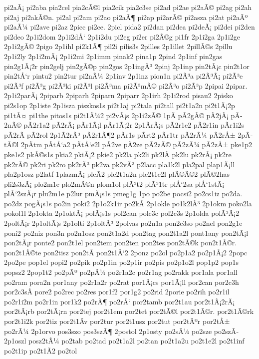 {pi2aÃ¡
pi2aba
pia2cel
pia2cÃ©l
pia2cik
pia2c3se
pi2ad
pi2ae
pi2aÃ©
pi2ag
pi2ah
pi2aj
pi2akÃ©n.
pi2al
pi2am
pi2ao
pi2aÃ¶
pi2ap
pi2arÃ©
pi2asza
pi2at
pi2aÃº
pi2aÃ¼
pi2ave
pi2az
2picc
pi2ce.
2picl
pida2
pi2dan
pi2dea
pi2deÃ¡
pi2dei
pi2den
pi2deo
2p1i2dom
2p1i2dÅ‘
2p1i2du
pi2eg
pi2er
pi2Ã©g
pi1fr
2p1i2ga
2p1i2ge
2p1i2gÃ©
2pigo
2p1ihl
pi2k1Ã¶
pil2i
pilis3s
2pilles
2p1illet
2pillÃ©s
2pillu
2p1i2ly
2p1i2mÃ¡
2p1i2mi
2p1imm
pinak2
pina1p
2pind
2p1inf
pin2gas
pin2g1Ã¡2r
pin2gelj
pin2gÃ©p
pin2gos
2p1ingÃ³
2pinj
2p1inp
pin2tÃ¡c
pin2t1or
pin2tÅ‘r
pintu2
pin2tur
pi2nÃ¼
2p1inv
2p1inz
pion1n
pi2Ã³a
pi2Ã³Ã¡
pi2Ã³e
pi2Ã³f
pi2Ã³g
pi2Ã³ki
pi2Ã³l
pi2Ã³ma
pi2Ã³mÃ©
pi2Ã³o
pi2Ã³p
2pipai
2pipar.
2p1i2parÃ¡
2piparb
2piparh
2piparn
2piparr
2p1irh
2p1i2rod
pisau2
2pisko
pi2s1op
2p1iste
2p1isza
piszkos1s
pi2t1aj
pi2tala
pi2tall
pi2t1a2n
pi2t1Ã¡2p
pi1tÃ¤
pi1the
pitos1s
pi2t1Ã¼2
pi2vÃ¡s
2p1i2zÃ©
1pÃ­
pÃ­2gÃ©
pÃ­2jÃ¡
pÃ­2nÃ©
pÃ­2r1a2
pÃ­2rÃ¡
pÃ­r1Ã¡l
pÃ­r1Ã¡2r
2p1Ã­rÃ¡s
pÃ­2r1e2
pÃ­2r1in
pÃ­r1i2s
pÃ­2rÃ­
pÃ­2rol
2p1Ã­2rÃ³
pÃ­2r1Ã¶2
pÃ­r1s
pÃ­rt2
pÃ­r1tr
pÃ­2rÃ¼
pÃ­2rÅ±
2pÃ­tÃ©l
2pÃ­tm
pÃ­tÅ‘a2
pÃ­tÅ‘e2l
pÃ­2ve
pÃ­2ze
pÃ­2zÃ©
pÃ­2zÃ¼
pÃ­2zÅ±
pke1p2
pke1s2
pkÃ©s1s
pkia2
pkiÃ¡2
pkie2
pk2la
pk2li
pk2lÃ­
pk2lu
pk2rÃ¡
pk2re
pk2rÃ©
pk2ri
pk2ro
pk2rÃ³
pk2va
pk2vÃ³
p2lacc
pla1k2l
pla2pal
plap1Ã¡ll
pla2p1osz
p2latf
1plazmÃ¡
pleÃ­2
ple2t1a2n
ple2t1e2l
plÃ©Ã©2
plÃ©2has
pli2s3zÃ¡
plo2m1e
plo2mÃ©n
plom1ol
plÃ³t2
plÃ³1tr
plÅ‘2sa
plÅ‘1stÃ¡
plÅ‘2szÃ¡r
plu2m1e
p2lur
pmÃ¡s1s
pmeg1g
1po
po2be
pocsi2
po2cs1iz
po2da.
po2dz
pogÃ¡s1s
po2in
poki2
2p1o2k1ir
po2kÃ­
2p1okle
po1k2lÃ³
2p1okm
poko2la
pokol1l
2p1okta
2p1oktÃ¡
polÃ¡s1s
pol2can
polc3c
pol2c3s
2p1olda
polÃ³Ã¡2
2poltÃ¡r
2p1oltÃ¡s
2p1olti
2p1oltÃ³
2polvas
po2n1a
pon2c3so
po2nel
pon2g1e
poni2
po2niz
pon3n
po2n1osz
pon2t1a2d
pon2tag
pon2t1a2l
pont1any
pon2tÃ¡l
pon2tÃ¡r
ponte2
pon2t1el
pon2tem
pon2ten
pon2tes
pon2tÃ©k
pon2t1Ã©r.
pon2t1Ã©te
pon2tisz
pon2tÃ­
pon2t1Å‘2
2ponz
po2ol
po2p1a2
po2p1Ã¡2
2popc
2po2pe
pop1el
popi2
po2pik
po2p1in
po2p1ir
po2pis
po2p1o2l
pop1p2
pop1s
popsz2
2pop1t2
po2pÃº
po2pÃ¼
po2r1a2c
po2r1ag
po2rakk
por1ala
por1all
po2ram
pora2n
por1any
po2r1a2r
po2rat
por1Ã¡cs
por1Ã¡ll
por2can
por2c3h
por2c3sÃ­
pore2
po2rec
po2res
por1f2
por1g2
po2rid
2porie
po2rih
po2r1il
po2r1i2m
po2r1in
por1k2
po2rÃ¶
po2rÅ‘
por2tamb
por2t1au
por2t1Ã¡2rÃ¡
por2tÃ¡rb
por2tÃ¡rn
por2tej
por2t1em
por2tet
por2tÃ©l
por2t1Ã©r.
por2t1Ã©rk
por2t1i2k
por2tiz
por2t1Ã­v
por2tur
por2t1usz
por2tut
por2tÃºr
por2tÅ±
po2rÃ¼
2p1orvo
pos3szo
pos3szÃ¶
2postol
2p1osty
po2sÃ¼
po2sze
po2szÃ­
2p1oszl
posz2tÃ¼
po2tab
po2tad
po2t1a2l
po2tan
po2t1a2u
po2t1e2l
po2t1inf
po2t1ip
po2t1Ã­2
po2tol
}
